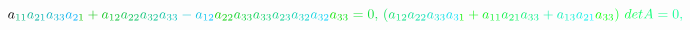 \documentclass[12pt]{article}
\begin{document}
\begin{displaymath}
{a} _ { \mathcolor[RGB]{15,180,120}{1} \mathcolor[RGB]{15,180,135}{1} } \mathcolor[RGB]{15,180,150}{a} _ { \mathcolor[RGB]{15,180,165}{2} \mathcolor[RGB]{15,180,180}{1} } \mathcolor[RGB]{15,180,195}{a} _ { \mathcolor[RGB]{15,180,210}{3} \mathcolor[RGB]{15,180,225}{3} } \mathcolor[RGB]{15,180,240}{a} _ { \mathcolor[RGB]{15,180,255}{2} \mathcolor[RGB]{15,195,0}{1} } \mathcolor[RGB]{15,195,15}{+} \mathcolor[RGB]{15,195,30}{a} _ { \mathcolor[RGB]{15,195,45}{1} \mathcolor[RGB]{15,195,60}{2} } \mathcolor[RGB]{15,195,75}{a} _ { \mathcolor[RGB]{15,195,90}{2} \mathcolor[RGB]{15,195,105}{2} } \mathcolor[RGB]{15,195,120}{a} _ { \mathcolor[RGB]{15,195,135}{3} \mathcolor[RGB]{15,195,150}{2} } \mathcolor[RGB]{15,195,165}{a} _ { \mathcolor[RGB]{15,195,180}{3} \mathcolor[RGB]{15,195,195}{3} } \mathcolor[RGB]{15,195,210}{-} \mathcolor[RGB]{15,195,225}{a} _ { \mathcolor[RGB]{15,195,240}{1} \mathcolor[RGB]{15,195,255}{2} } \mathcolor[RGB]{15,210,0}{a} _ { \mathcolor[RGB]{15,210,15}{2} \mathcolor[RGB]{15,210,30}{2} } \mathcolor[RGB]{15,210,45}{a} _ { \mathcolor[RGB]{15,210,60}{3} \mathcolor[RGB]{15,210,75}{3} } \mathcolor[RGB]{15,210,90}{a} _ { \mathcolor[RGB]{15,210,105}{3} \mathcolor[RGB]{15,210,120}{3} } \mathcolor[RGB]{15,210,135}{a} _ { \mathcolor[RGB]{15,210,150}{2} \mathcolor[RGB]{15,210,165}{3} } \mathcolor[RGB]{15,210,180}{a} _ { \mathcolor[RGB]{15,210,195}{3} \mathcolor[RGB]{15,210,210}{2} } \mathcolor[RGB]{15,210,225}{a} _ { \mathcolor[RGB]{15,210,240}{3} \mathcolor[RGB]{15,210,255}{2} } \mathcolor[RGB]{15,225,0}{a} _ { \mathcolor[RGB]{15,225,15}{3} \mathcolor[RGB]{15,225,30}{3} } \mathcolor[RGB]{15,225,45}{=} \mathcolor[RGB]{15,225,60}{0} \mathcolor[RGB]{15,225,75}{,} \mathcolor[RGB]{15,225,90}{\,
(} \mathcolor[RGB]{15,225,105}{a} _ { \mathcolor[RGB]{15,225,120}{1} \mathcolor[RGB]{15,225,135}{2} } \mathcolor[RGB]{15,225,150}{a} _ { \mathcolor[RGB]{15,225,165}{2} \mathcolor[RGB]{15,225,180}{2} } \mathcolor[RGB]{15,225,195}{a} _ { \mathcolor[RGB]{15,225,210}{3} \mathcolor[RGB]{15,225,225}{3} } \mathcolor[RGB]{15,225,240}{a} _ { \mathcolor[RGB]{15,225,255}{3} \mathcolor[RGB]{15,240,0}{1} } \mathcolor[RGB]{15,240,15}{+} \mathcolor[RGB]{15,240,30}{a} _ { \mathcolor[RGB]{15,240,45}{1} \mathcolor[RGB]{15,240,60}{1} } \mathcolor[RGB]{15,240,75}{a} _ { \mathcolor[RGB]{15,240,90}{2} \mathcolor[RGB]{15,240,105}{1} } \mathcolor[RGB]{15,240,120}{a} _ { \mathcolor[RGB]{15,240,135}{3} \mathcolor[RGB]{15,240,150}{3} } \mathcolor[RGB]{15,240,165}{+} \mathcolor[RGB]{15,240,180}{a} _ { \mathcolor[RGB]{15,240,195}{1} \mathcolor[RGB]{15,240,210}{3} } \mathcolor[RGB]{15,240,225}{a} _ { \mathcolor[RGB]{15,240,240}{2} \mathcolor[RGB]{15,240,255}{1} } \mathcolor[RGB]{15,255,0}{a} _ { \mathcolor[RGB]{15,255,15}{3} \mathcolor[RGB]{15,255,30}{3} } \mathcolor[RGB]{15,255,45}{)} \mathcolor[RGB]{15,255,60}{\operatorname*} { \mathcolor[RGB]{15,255,75}{d} \mathcolor[RGB]{15,255,90}{e} \mathcolor[RGB]{15,255,105}{t} } \mathcolor[RGB]{15,255,120}{A} \mathcolor[RGB]{15,255,135}{=} \mathcolor[RGB]{15,255,150}{0} \mathcolor[RGB]{15,255,165}{,} \mathcolor[RGB]{15,255,180}{\,
}
\end{displaymath}
\end{document}
